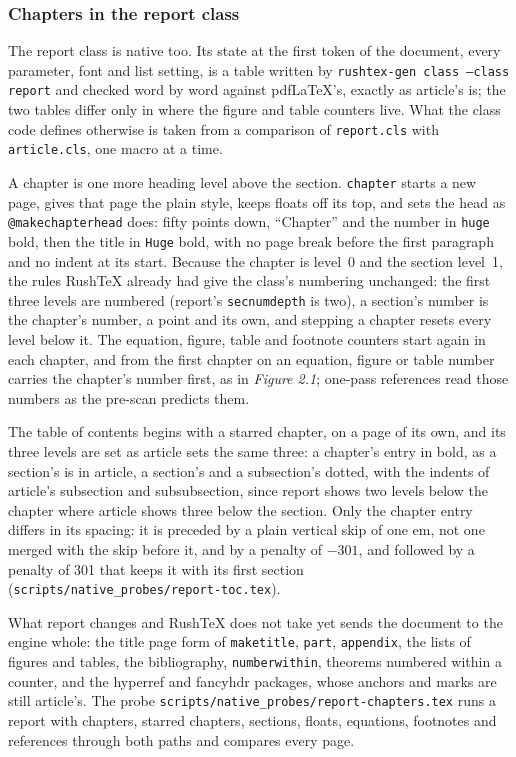 \documentclass{article}
\numberwithin{equation}{section}
\theoremstyle{definition}
\theoremstyle{remark}
\begin{document}
\subsubsection{Chapters in the report class}

The report class is native too. Its state at the first token of the document, every
parameter, font and list setting, is a table written by \texttt{rushtex-gen class
--class report} and checked word by word against pdfLaTeX's, exactly as article's is;
the two tables differ only in where the figure and table counters live. What the class
code defines otherwise is taken from a comparison of \texttt{report.cls} with
\texttt{article.cls}, one macro at a time.

A chapter is one more heading level above the section. \texttt{chapter} starts a new
page, gives that page the plain style, keeps floats off its top, and sets the head as
\texttt{@makechapterhead} does: fifty points down, ``Chapter'' and the number in
\texttt{huge} bold, then the title in \texttt{Huge} bold, with no page break before the
first paragraph and no indent at its start. Because the chapter is level~0 and the
section level~1, the rules RushTeX already had give the class's numbering unchanged: the
first three levels are numbered (report's \texttt{secnumdepth} is two), a section's number
is the chapter's number, a point and its own, and stepping a chapter resets every level
below it. The equation, figure, table and footnote counters start again in each chapter,
and from the first chapter on an equation, figure or table number carries the chapter's
number first, as in \textit{Figure 2.1}; one-pass references read those numbers as the
pre-scan predicts them.

The table of contents begins with a starred chapter, on a page of its own, and its
three levels are set as article sets the same three: a chapter's entry in bold, as a
section's is in article, a section's and a subsection's dotted, with the indents of
article's subsection and subsubsection, since report shows two levels below the chapter
where article shows three below the section. Only the chapter entry differs in its
spacing: it is preceded by a plain vertical skip of one em, not one merged with the skip
before it, and by a penalty of $-301$, and followed by a penalty of 301 that keeps it
with its first section (\texttt{scripts/native\_probes/report-toc.tex}).

What report changes and RushTeX does not take yet sends the document to the engine
whole: the title page form of \texttt{maketitle}, \texttt{part},
\texttt{appendix}, the lists of figures and tables, the bibliography, \texttt{numberwithin}, theorems numbered
within a counter, and the hyperref and fancyhdr packages, whose anchors and marks are
still article's. The probe \texttt{scripts/native\_probes/report-chapters.tex} runs a
report with chapters, starred chapters, sections, floats, equations, footnotes and
references through both paths and compares every page.
\end{document}
